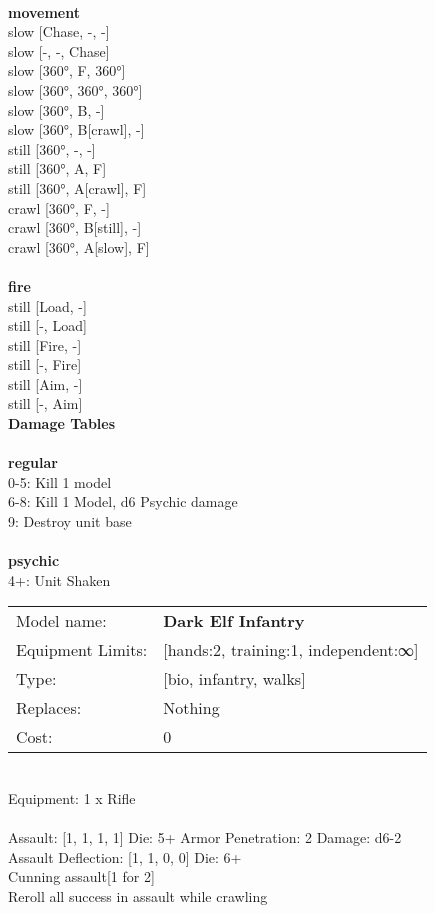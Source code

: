 \ \\ {\bf movement } \\
slow [Chase, -, -] \\
slow [-, -, Chase] \\
slow [360°, F, 360°] \\
slow [360°, 360°, 360°] \\
slow [360°, B, -] \\
slow [360°, B[crawl], -] \\
still [360°, -, -] \\
still [360°, A, F] \\
still [360°, A[crawl], F] \\
crawl [360°, F, -] \\
crawl [360°, B[still], -] \\
crawl [360°, A[slow], F] \\
\ \\ {\bf fire } \\
still [Load, -] \\
still [-, Load] \\
still [Fire, -] \\
still [-, Fire] \\
still [Aim, -] \\
still [-, Aim] \\


{\bf Damage Tables} \\
\ \\ {\bf regular } \\
0-5: Kill 1 model \\
6-8: Kill 1 Model, d6 Psychic damage \\
9: Destroy unit base \\
\ \\ {\bf psychic } \\
4+: Unit Shaken \\


\noindent
\begin{tabular}{ll}
Model name: &{\bf Dark Elf Infantry } \\
Equipment Limits: &[hands:2, training:1, independent:∞] \\
Type: &[bio, infantry, walks] \\
Replaces: &Nothing \\
Cost: & 0\\
\end{tabular}
\ \\
Equipment: 1 x Rifle \\
\ \\
Assault: [1, 1, 1, 1] Die: 5+ Armor Penetration: 2 Damage: d6-2 \\
Assault Deflection: [1, 1, 0, 0] Die: 6+\\
\indent Cunning assault[1 for 2]\\ 
Reroll all success in assault while crawling\\ 
 
